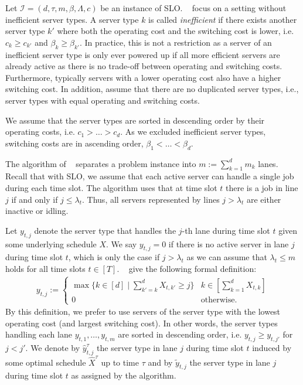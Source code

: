 Let $\mathcal{I} = (d, \tau, m, \beta, \Lambda, c)$ be an instance of SLO. \citeauthor{Albers2021}~\cite{Albers2021} focus on a setting without inefficient server types. A server type $k$ is called \emph{inefficient} if there exists another server type $k'$ where both the operating cost and the switching cost is lower, i.e. $c_k \geq c_{k'}$ and $\beta_k \geq \beta_{k'}$. In practice, this is not a restriction as a server of an inefficient server type is only ever powered up if all more efficient servers are already active as there is no trade-off between operating and switching costs. Furthermore, typically servers with a lower operating cost also have a higher switching cost. In addition, \citeauthor{Albers2021} assume that there are no duplicated server types, i.e., server types with equal operating and switching costs.

We assume that the server types are sorted in descending order by their operating costs, i.e. $c_1 > \dots > c_d$. As we excluded inefficient server types, switching costs are in ascending order, $\beta_1 < \dots < \beta_d$.

The algorithm of \citeauthor{Albers2021}~\cite{Albers2021} separates a problem instance into $m := \sum_{k=1}^d m_k$ lanes. Recall that with SLO, we assume that each active server can handle a single job during each time slot. The algorithm uses that at time slot $t$ there is a job in line $j$ if and only if $j \leq \lambda_{t}$. Thus, all servers represented by lines $j > \lambda_{t}$ are either inactive or idling.

Let $y_{t,j}$ denote the server type that handles the $j$-th lane during time slot $t$ given some underlying schedule $X$. We say $y_{t,j} = 0$ if there is no active server in lane $j$ during time slot $t$, which is only the case if $j > \lambda_{t}$ as we can assume that $\lambda_{t} \leq m$ holds for all time slots $t \in [T]$. \citeauthor{Albers2021}~\cite{Albers2021} give the following formal definition: \begin{align*}
    y_{t,j} := \begin{cases}
        \max \{k \in [d] \mid \sum_{k' = k}^d X_{t,k'} \geq j\} & k \in \left[\sum_{k=1}^d X_{t,k}\right] \\
        0 & \text{otherwise}.
    \end{cases}
\end{align*} By this definition, we prefer to use servers of the server type with the lowest operating cost (and largest switching cost). In other words, the server types handling each lane $y_{t,1}, \dots, y_{t,m}$ are sorted in descending order, i.e. $y_{t,j} \geq y_{t,j'}$ for $j < j'$. We denote by $\hat{y}_{t,j}^{\tau}$ the server type in lane $j$ during time slot $t$ induced by some optimal schedule $\hat{X}^{\tau}$ up to time $\tau$ and by $\widetilde{y}_{t,j}$ the server type in lane $j$ during time slot $t$ as assigned by the algorithm.

